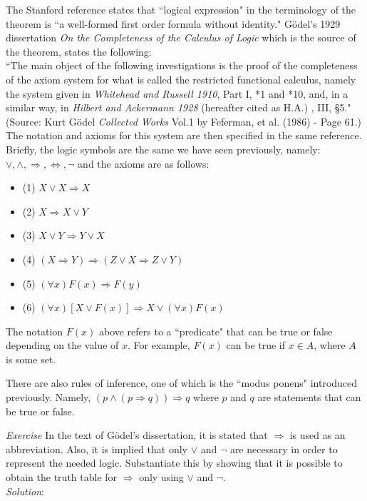 The Stanford reference states that ``logical expression" in the terminology of the theorem is ``a well-formed first order formula without identity."  G\"odel's 1929 dissertation \textit{On the Completeness of the Calculus of Logic} which is the source of the theorem, states the following:\\
``The main object of the following investigations is the proof of the completeness of the axiom system for what is called the restricted functional calculus, namely the system given in \textit{Whitehead and Russell 1910}, Part I, *1 and *10, and, in a similar way, in \textit{Hilbert and Ackermann 1928} (hereafter cited as H.A.) , III, \S 5."  (Source: Kurt G\"odel \textit{Collected Works} Vol.1 by Feferman, et al. (1986) - Page 61.)\\

The notation and axioms for this system are then specified in the same reference.  Briefly, the logic symbols are the same we have seen previously, namely: $\lor, \land, \Longrightarrow, \Longleftrightarrow, \neg$ and the axioms are as follows:\\

\begin{itemize}
\item (1) $X \lor X \Longrightarrow X$
\item (2) $X \Longrightarrow X \lor Y$
\item (3) $X \lor Y \Longrightarrow Y \lor X$
\item (4) $(X \Longrightarrow Y) \Longrightarrow (Z \lor X \Longrightarrow Z \lor Y)$
\item (5) $(\forall x)F(x) \Longrightarrow F(y)$
\item (6) $(\forall x)[X \lor F(x)] \Longrightarrow X \lor (\forall x)F(x)$
\end{itemize}

The notation $F(x)$ above refers to a ``predicate" that can be true or false depending on the value of $x$.  For example, $F(x)$ can be true if $x \in A$, where $A$ is some set.

There are also rules of inference, one of which is the ``modus ponens" introduced previously.  Namely, $(p \land (p \Longrightarrow q)) \Longrightarrow q$ where $p$ and $q$ are statements that can be true or false.

\textit{Exercise} In the text of G\"odel's dissertation, it is stated that $\Longrightarrow$ is used as an abbreviation.  Also, it is implied that only $\lor$ and $\neg$ are necessary in order to represent the needed logic.  Substantiate this by showing that it is possible to obtain the truth table for $\Longrightarrow$ only using $\lor$ and $\neg$.\\
\textit{Solution}:

